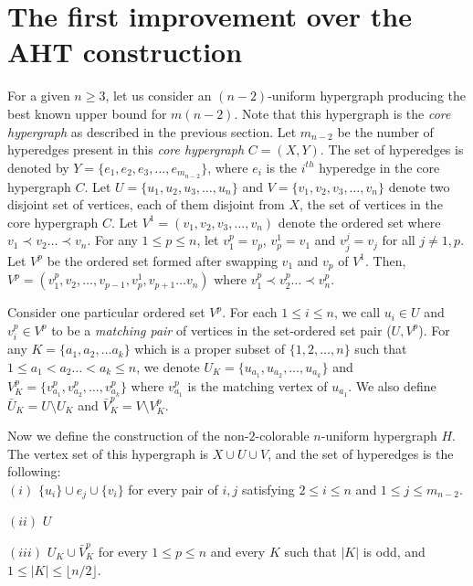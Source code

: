 \documentclass[11pt]{article}
\begin{document}
\section{The first improvement over the AHT construction}

For a given $n \geq 3$, let us consider an $(n-2)$-uniform hypergraph producing the best known upper bound for $m(n-2)$. Note that this hypergraph is the {\it core hypergraph} as described in the previous section. Let $m_{n-2}$ be the number of hyperedges present in this \textit{core hypergraph} $C =(X, Y)$. The set of hyperedges is denoted by 
$Y = \{e_1, e_2, e_3, \ldots, e_{m_{n-2}}\}$, where $e_i$ is the $i^{th}$ hyperedge in the core hypergraph $C$. 
Let $U = \{u_1, u_2, u_3, \ldots, u_n\}$ and $V = \{v_1, v_2, v_3, \ldots, v_n\}$ denote two disjoint set of vertices, each of them disjoint from $X$, the set of vertices in the core hypergraph $C$. Let $V^1 = (v_1, v_2, v_3, \ldots, v_n)$ denote the ordered set where $v_1 \prec v_2 \ldots \prec v_n$. For any $1 \leq p \leq n$, let $v_1^p=v_p$, $v_p^1 = v_1$ and $v_j^j = v_j$ for all $j \neq 1,p$. Let $V^p$ be the ordered set formed after swapping $v_1$ and $v_p$ of $V^1$. Then, $V^p = (v_1^p, v_2,\ldots, v_{p-1},v_p^1,v_{p+1} \ldots v_n)$ where $v_1^p \prec v_2^p \ldots \prec v_n^p$.


Consider one particular ordered set $V^p$. For each $1 \leq i \leq n$, we call $u_i \in U$ and $v_i^p \in V^p$ to be a {\it matching pair} of vertices in the set-ordered set pair ($U,V^p$). For any $K =  \{a_1, a_2, \ldots a_k\}$ which is a proper subset of $\{1, 2, \ldots, n\}$ such that $1 \leq a_1 < a_2 \ldots < a_k \leq n$, we denote $U_K = \{u_{a_1}, u_{a_2}, \ldots, u_{a_k}\}$ and $V_K^p = \{v_{a_1}^p, v_{a_2}^p, \ldots, v_{a_k}^p\}$ where $v_{a_1}^p$ is the matching vertex of $u_{a_1}$. We also define ${\bar{U}}_K = U \setminus U_K$ and ${\bar{V}^p_K} = V \setminus V_K^p$.


Now we define the construction of the non-$2$-colorable $n$-uniform hypergraph $H$. The vertex set of this hypergraph is $X \cup U \cup V$, and the set of hyperedges is the following:\\

$(i)$ $\{u_i\} \cup e_j \cup \{v_i\}$ for every pair of $i, j$ satisfying $2 \leq i \leq n$ and $1 \leq j \leq m_{n-2}$.

$(ii)$ $U$

$(iii)$ $U_K \cup {\bar{V}^p_K}$ for every $1 \leq p \leq n$ and every $K$ such that $|K|$ is odd, and $1 \leq |K| \leq \lfloor n/2 \rfloor$.
\end{document}
